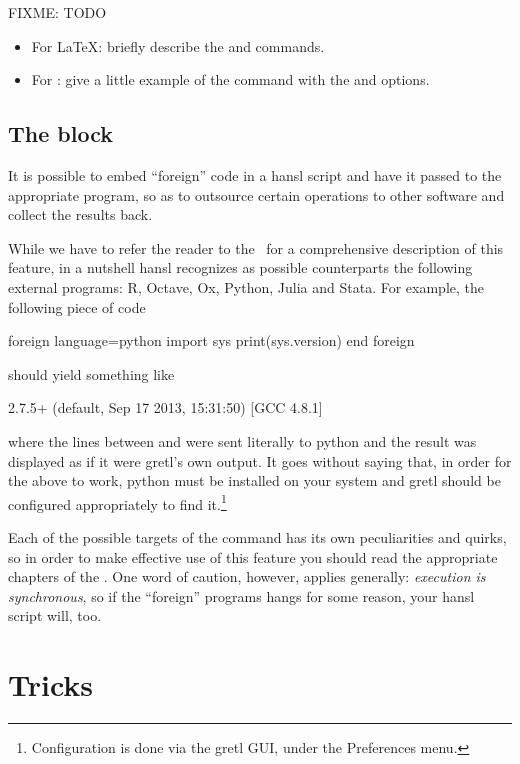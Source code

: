 FIXME: TODO

\begin{itemize}
\item For \LaTeX: briefly describe the  and
   commands.
\item For : give a little example of the 
  command with the  and  options.
\end{itemize}

\section{The  block}

It is possible to embed ``foreign'' code in a hansl script and have it
passed to the appropriate program, so as to outsource certain
operations to other software and collect the results back.

While we have to refer the reader to the \GUG\ for a comprehensive
description of this feature, in a nutshell hansl recognizes as
possible counterparts the following external programs: \textsf{R},
\textsf{Octave}, \textsf{Ox}, \textsf{Python}, \textsf{Julia} and
\textsf{Stata}.  For example, the following piece of code
\begin{code}
foreign language=python
	import sys
	print(sys.version)
end foreign
\end{code}
should yield something like
\begin{code}
2.7.5+ (default, Sep 17 2013, 15:31:50) 
[GCC 4.8.1]
\end{code}
where the lines between  and  were sent
literally to \textsf{python} and the result was displayed as if it
were gretl's own output. It goes without saying that, in order for the
above to work, \textsf{python} must be installed on your system and
gretl should be configured appropriately to find
it.\footnote{Configuration is done via the gretl GUI, under the
\textsf{Preferences} menu.}

Each of the possible targets of the  command has its own
peculiarities and quirks, so in order to make effective use of this
feature you should read the appropriate chapters of the \GUG. One word
of caution, however, applies generally: \emph{execution is
  synchronous}, so if the ``foreign'' programs hangs for some reason,
your hansl script will, too.

\chapter{Tricks}

